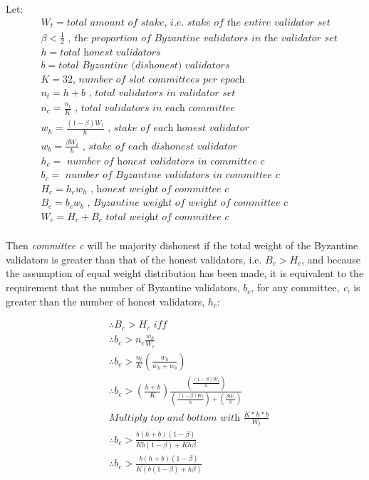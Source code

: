 \documentclass[UTF8]{article}
\begin{document}
\noindent
Let:
\begin{equation*}
\begin{split}
&W_t  = \textit{total amount of stake, i.e. stake of the entire validator set}\\
& \beta  < \frac{1}{2}  \textit{ , the proportion of Byzantine validators in the validator set}\\
& h  = \textit{total honest validators} \\
& b  =  \textit{total Byzantine (dishonest) validators} \\
& K  = 32 \textit{, number of slot committees per epoch} \\
& n_t  = h + b \textit{ , total validators in validator set} \\
& n_c  = \frac{n_t}{K} \textit{ , total validators in each committee} \\
& w_h  = \frac{(1- \beta)W_t}{h} \textit{ , stake of each honest validator }\\
& w_b  = \frac{\beta W_t}{b}  \textit{ , stake of each dishonest validator }\\
& h_c = \textit{ number of honest validators in committee c} \\
& b_c =  \textit{ number of Byzantine validators in committee c} \\
& H_c  = h_c w_h \textit{ , honest weight of committee c} \\
& B_c = b_c w_b \textit{ , Byzantine weight of weight of committee c} \\
& W_c = H_c + B_c \textit{ total weight of committee c} \\
\end{split}
\end{equation*}

Then \textit{committee c} will be majority dishonest if the total weight of the Byzantine validators is greater than that of the honest validators, i.e. $B_c > H_c$, and because the assumption of equal weight distribution has been made, it is equivalent to the requirement that the number of Byzantine validators, $b_c$, for any committee, \textit{c}, is greater than the number of honest validators, $h_c$:

\begin{equation*}
\begin{split}
& \therefore B_c > H_c \textit{ iff} \\
& \therefore b_c > n_c  \frac{w_h}{W_c} \\
& \therefore b_c > \frac{n_t}{K} \left( \frac{w_h}{w_h + w_b} \right) \\
& \therefore b_c > \left( \frac{h + b}{K} \right) \frac{\left( \frac{(1-\beta) W_t}{h} \right)}{\left( \frac{(1-\beta) W_t}{h} \right) + \left( \frac{\beta W_t}{b} \right)} \\
& \textit{Multiply top and bottom with } \frac{K * h * b}{W_t} \\
& \therefore b_c > \frac{ b(h + b) (1 - \beta)}{K b (1-\beta) + K h \beta } \\
& \therefore b_c > \frac{ b(h + b) (1 - \beta)}{K(b (1-\beta) + h \beta) } \\
\end{split}
\end{equation*}
\end{document}
